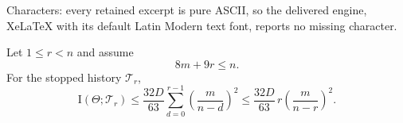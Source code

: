 \documentclass[10pt,a4paper]{amsart}
\begin{document}
Characters: every retained excerpt is pure ASCII, so the delivered engine, XeLaTeX with its default Latin Modern text font, reports no missing character.
\begin{lemma}
\label{lem:first-use-row-information}
Let $1\le r<n$ and assume
\begin{equation}
 8m+9r\le n.
 \label{eq:row-information-interior}
\end{equation}
For the stopped history $\mathcal T_r$,
\begin{equation}
 \mathrm I(\Theta;\mathcal T_r)
 \le
 \frac{32D}{63}
 \sum_{d=0}^{r-1}
 \left(\frac{m}{n-d}\right)^2
 \le
 \frac{32D}{63}\,
 r\left(\frac{m}{n-r}\right)^2.
 \label{eq:first-use-row-information}
\end{equation}
\end{lemma}
\end{document}
